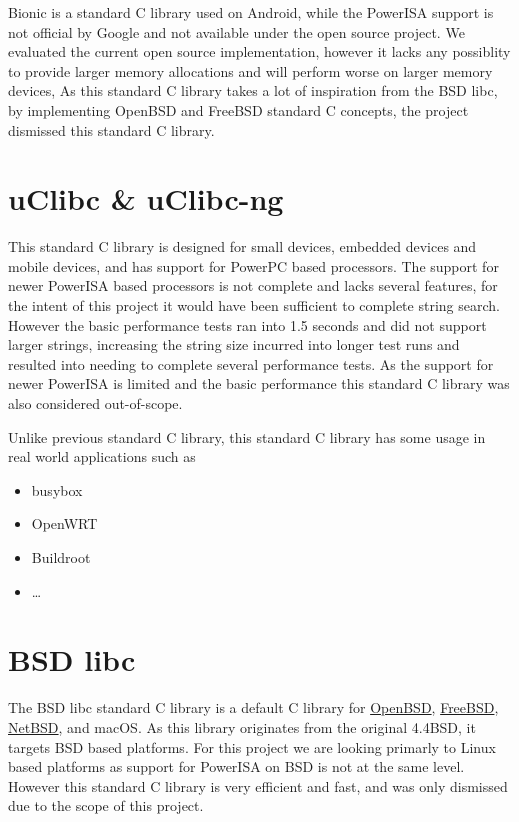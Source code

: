 Bionic is a standard C library used on Android, while the PowerISA support is not official by Google and not available under the open source project.
We evaluated the current open source implementation, however it lacks any possiblity to provide larger memory allocations
and will perform worse on larger memory devices,
As this standard C library takes a lot of inspiration from the \acrshort{BSD} libc, by implementing OpenBSD and FreeBSD standard C concepts,
the project dismissed this standard C library.
\par

\section{uClibc \& uClibc-ng}
\label{content:uclibc}

This standard C library is designed for small devices, embedded devices and mobile devices, and has support for PowerPC based processors.
The support for newer PowerISA based processors is not complete and lacks several features,
for the intent of this project it would have been sufficient to complete string search.
However the basic performance tests ran into 1.5 seconds and did not support larger strings,
increasing the string size incurred into longer test runs and resulted into needing to complete several performance tests.
As the support for newer PowerISA is limited and the basic performance this standard C library was also considered out-of-scope.
\par

Unlike previous standard C library, this standard C library has some usage in real world applications such as
\begin{itemize}
\item
busybox
\item
OpenWRT
\item
Buildroot
\item
\ldots
\end{itemize}

\section{\acrshort{BSD} libc}

The \acrshort{BSD} libc standard C library is a default C library for 
\href{https://www.openbsd.org/}{OpenBSD},
\href{https://www.freebsd.org/}{FreeBSD},
\href{https://www.netbsd.org/}{NetBSD}, and macOS.
As this library originates from the original 4.4BSD, it targets \acrshort{BSD} based platforms.
For this project we are looking primarly to Linux based platforms as support for PowerISA on \acrshort{BSD} is not at the same level.
However this standard C library is very efficient and fast, and was only dismissed due to the scope of this project.
\par

